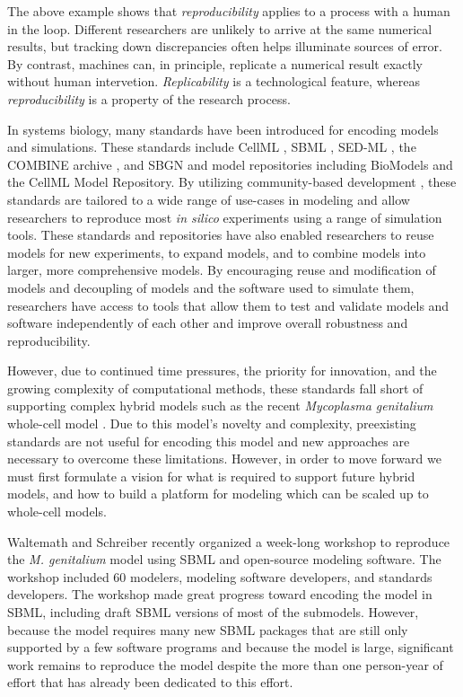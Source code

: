 \documentclass[journal,transmag,twoside]{IEEEtran}
\begin{document}
The above example shows that \textit{reproducibility} applies to a process with a human in the loop. Different researchers are unlikely to arrive at the same numerical results, but tracking down discrepancies often helps illuminate sources of error. By contrast, machines can, in principle, replicate a numerical result exactly without human intervetion. \textit{Replicability} is a technological feature, whereas \textit{reproducibility} is a property of the research process.

In systems biology, many standards have been introduced for encoding models and simulations. These standards include CellML \cite{cuellar2003overview}, SBML \cite{hucka2003}, SED-ML \cite{sedml2011}, the COMBINE archive \cite{COMBINE2012}, and SBGN \cite{LeNovereHMMSS09} and model repositories including BioModels and the CellML Model Repository.
By utilizing community-based development \cite{hucka2015promoting} \cite{drager2014improving}, these standards are tailored to a wide range of use-cases in modeling and allow researchers to reproduce most \textit{in silico} experiments using a range of simulation tools. These standards and repositories have also enabled researchers to reuse models for new experiments, to expand models, and to combine models into larger, more comprehensive models. By encouraging reuse and modification of models and decoupling of models and the software used to simulate them, researchers have access to tools that allow them to test and validate models and software independently of each other and improve overall robustness and reproducibility.

However, due to continued time pressures, the priority for innovation, and the growing complexity of computational methods, these standards fall short of supporting complex hybrid models such as the recent \textit{Mycoplasma genitalium} whole-cell model \cite{Karr2012}. Due to this model's novelty and complexity, preexisting standards are not useful for encoding this model and new approaches are necessary to overcome these limitations. However, in order to move forward we must first formulate a vision for what is required to support future hybrid models, and how to build a platform for modeling which can be scaled up to whole-cell models.

Waltemath and Schreiber recently organized a week-long workshop to reproduce the \textit{M. genitalium} model using SBML and open-source modeling software. The workshop included 60 modelers, modeling software developers, and standards developers. The workshop made great progress toward encoding the model in SBML, including draft SBML versions of most of the submodels. However, because the model requires many new SBML packages that are still only supported by a few software programs and because the model is large, significant work remains to reproduce the model despite the more than one person-year of effort that has already been dedicated to this effort.
\end{document}
